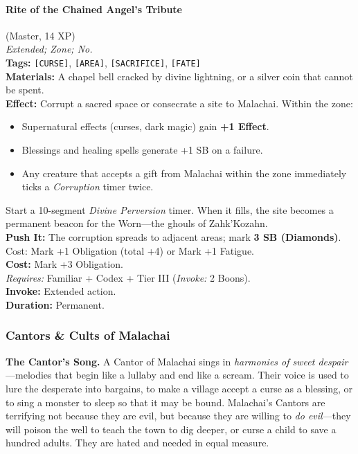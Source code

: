 \paragraph{Rite of the Chained Angel's Tribute} (Master, 14 XP) \hfill \\
\emph{Extended; Zone; No.} \\
\textbf{Tags:} \texttt{[CURSE]}, \texttt{[AREA]}, \texttt{[SACRIFICE]}, \texttt{[FATE]} \\
\textbf{Materials:} A chapel bell cracked by divine lightning, or a silver coin that cannot be spent. \\
\textbf{Effect:} Corrupt a sacred space or consecrate a site to Malachai. Within the zone:
\begin{itemize}
  \item Supernatural effects (curses, dark magic) gain \textbf{+1 Effect}.
  \item Blessings and healing spells generate +1 SB on a failure.
  \item Any creature that accepts a gift from Malachai within the zone immediately ticks a \textit{Corruption} timer twice.
\end{itemize}
Start a 10-segment \textit{Divine Perversion} timer. When it fills, the site becomes a permanent beacon for the Worn---the ghouls of Zahk'Kozahn. \\
\textbf{Push It:} The corruption spreads to adjacent areas; mark \textbf{3 SB (Diamonds)}. Cost: Mark +1 Obligation (total +4) or Mark +1 Fatigue. \\
\textbf{Cost:} Mark +3 Obligation. \\
\textit{Requires:} Familiar + Codex + Tier III (\textit{Invoke:} 2 Boons). \\
\textbf{Invoke:} Extended action. \\
\textbf{Duration:} Permanent.

\subsubsection*{Cantors \& Cults of Malachai}

\textbf{The Cantor's Song.} A Cantor of Malachai sings in \textit{harmonies of sweet despair}---melodies that begin like a lullaby and end like a scream. Their voice is used to lure the desperate into bargains, to make a village accept a curse as a blessing, or to sing a monster to sleep so that it may be bound. Malachai's Cantors are terrifying not because they are evil, but because they are willing to \textit{do evil}---they will poison the well to teach the town to dig deeper, or curse a child to save a hundred adults. They are hated and needed in equal measure.

